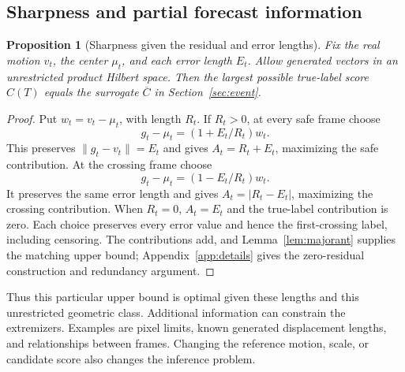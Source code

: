 \documentclass[11pt]{article}
\theoremstyle{noteplain}
\newtheorem{proposition}{Proposition}
\newcommand{\norm}[1]{\lVert #1\rVert}
\begin{document}
\subsection{Sharpness and partial forecast information}
\begin{proposition}[Sharpness given the residual and error lengths]\label{prop:sharp}
Fix the real motion $v_t$, the center $\mu_t$, and each error length $E_t$. Allow generated vectors in an unrestricted product Hilbert space. Then the largest possible true-label score $C(T)$ equals the surrogate $\overline C$ in Section~\ref{sec:event}.
\end{proposition}
\begin{proof}
Put $w_t=v_t-\mu_t$, with length $R_t$. If $R_t>0$, at every safe frame choose
\[
 g_t-\mu_t=(1+E_t/R_t)w_t .
\]
This preserves $\norm{g_t-v_t}=E_t$ and gives $A_t=R_t+E_t$, maximizing the safe contribution. At the crossing frame choose
\[
 g_t-\mu_t=(1-E_t/R_t)w_t .
\]
It preserves the same error length and gives $A_t=|R_t-E_t|$, maximizing the crossing contribution. When $R_t=0$, $A_t=E_t$ and the true-label contribution is zero. Each choice preserves every error value and hence the first-crossing label, including censoring. The contributions add, and Lemma~\ref{lem:majorant} supplies the matching upper bound; Appendix~\ref{app:details} gives the zero-residual construction and redundancy argument.
\end{proof}
Thus this particular upper bound is optimal given these lengths and this unrestricted geometric class. Additional information can constrain the extremizers. Examples are pixel limits, known generated displacement lengths, and relationships between frames. Changing the reference motion, scale, or candidate score also changes the inference problem.
\end{document}
